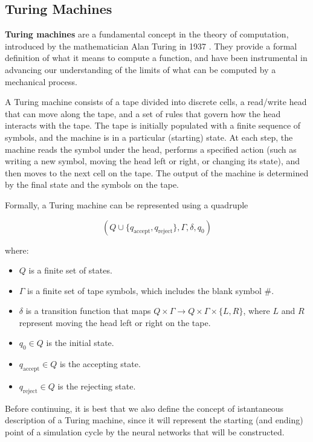 \documentclass{article}
\begin{document}
\subsection{Turing Machines}

\textbf{Turing machines} are a fundamental concept in the theory of computation, introduced by the mathematician Alan Turing in 1937 \cite{TUR37}. They provide a formal definition of what it means to compute a function, and have been instrumental in advancing our understanding of the limits of what can be computed by a mechanical process.

A Turing machine consists of a tape divided into discrete cells, a read/write head that can move along the tape, and a set of rules that govern how the head interacts with the tape. The tape is initially populated with a finite sequence of symbols, and the machine is in a particular (starting) state. At each step, the machine reads the symbol under the head, performs a specified action (such as writing a new symbol, moving the head left or right, or changing its state), and then moves to the next cell on the tape. The output of the machine is determined by the final state and the symbols on the tape.

Formally, a Turing machine can be represented using a quadruple

\begin{equation}
(Q \cup \{q_{\mathrm{accept}}, q_{\mathrm{reject}} \}, \Gamma, \delta, q_0)
\end{equation}

where:

\begin{itemize}
    \item $Q$ is a finite set of states.
    \item $\Gamma$ is a finite set of tape symbols, which includes the blank symbol $\#$.
    \item $\delta$ is a transition function that maps $Q \times \Gamma \rightarrow Q \times \Gamma \times \{L, R\}$, where $L$ and $R$ represent moving the head left or right on the tape.
    \item $q_0 \in Q$ is the initial state.
    \item $q_{\mathrm{accept}} \in Q$ is the accepting state.
    \item $q_{\mathrm{reject}} \in Q$ is the rejecting state.
\end{itemize}

Before continuing, it is best that we also define the concept of istantaneous description of a Turing machine, since it will represent the starting (and ending) point of a simulation cycle by the neural networks that will be constructed.
\end{document}
